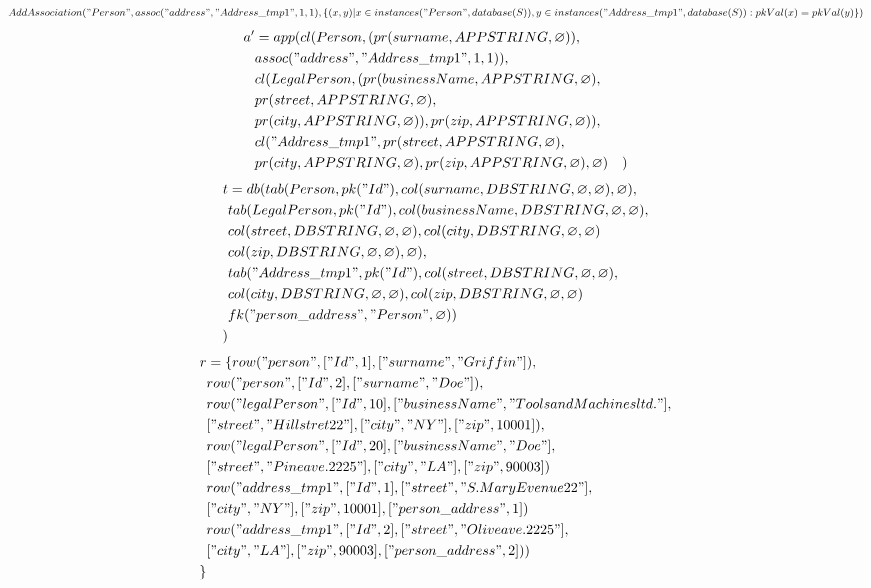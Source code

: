 \documentclass[11pt]{article}
\begin{document}
\newpage
$AddAssociation("Person", assoc("address", "Address\_tmp1", 1, 1), 
 \{(x,y)| x \in instances("Person", database(S)), y \in instances("Address\_tmp1", database(S)) : pkVal(x) = pkVal(y) \})$
\begin{align*}
a' &= app(cl(Person, (pr(surname, APPSTRING, \varnothing)), \\ 
& assoc("address", "Address\_tmp1", 1, 1)), \\ 
& cl(LegalPerson, (pr(businessName, APPSTRING, \varnothing), \\
& pr(street, APPSTRING, \varnothing), \\
& pr(city, APPSTRING, \varnothing)), pr(zip, APPSTRING, \varnothing)), \\
& cl("Address\_tmp1", pr(street, APPSTRING, \varnothing), \\
& pr(city, APPSTRING, \varnothing), pr(zip, APPSTRING, \varnothing), \varnothing)
& )
\end{align*}
\begin{align*}
t &= db(tab(Person, pk("Id"), col(surname, DBSTRING, \varnothing, \varnothing), \varnothing), \\
& tab(LegalPerson, pk("Id"),  col(businessName, DBSTRING, \varnothing, \varnothing), \\
& col(street, DBSTRING, \varnothing, \varnothing), col(city, DBSTRING, \varnothing, \varnothing) \\
& col(zip, DBSTRING, \varnothing, \varnothing), \varnothing), \\
& tab("Address\_tmp1", pk("Id"), col(street, DBSTRING, \varnothing, \varnothing),\\
& col(city, DBSTRING, \varnothing, \varnothing), col(zip, DBSTRING, \varnothing, \varnothing) \\
& fk("person\_address", "Person", \varnothing))\\
) 
\end{align*}
\begin{align*}
r &= \{ row("person", ["Id", 1], ["surname", "Griffin"]), \\
& row("person", ["Id", 2], ["surname", "Doe"]), \\
& row("legalPerson", ["Id", 10], ["businessName", "Tools and Machines ltd."], \\
& ["street", "Hill stret 22"], ["city", "NY"], ["zip", 10001]), \\
& row("legalPerson", ["Id", 20], ["businessName", "Doe"], \\
& ["street", "Pine ave. 2225"], ["city", "LA"], ["zip", 90003])\\
& row("address\_tmp1", ["Id", 1], ["street", "S. Mary Evenue 22"], \\
& ["city", "NY"], ["zip", 10001], ["person\_address", 1]) \\
& row("address\_tmp1", ["Id", 2], ["street", "Olive ave. 2225"], \\
& ["city", "LA"], ["zip", 90003], ["person\_address", 2]) )\\
\}
\end{align*}
\end{document}
